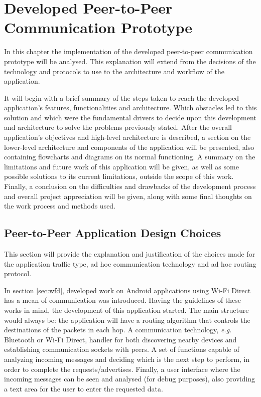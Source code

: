 \chapter{Developed Peer-to-Peer Communication Prototype}
\label{chapter:work}

In this chapter the implementation of the developed peer-to-peer communication prototype will be analysed. This explanation will extend from the decisions of the technology and protocols to use to the architecture and workflow of the application.

It will begin with a brief summary of the steps taken to reach the developed application's features, functionalities and architecture. Which obstacles led to this solution and which were the fundamental drivers to decide upon this development and architecture to solve the problems previously stated. After the overall application's objectives and high-level architecture is described, a section on the lower-level architecture and components of the application will be presented, also containing flowcharts and diagrams on its normal functioning. A summary on the limitations and future work of this application will be given, as well as some possible solutions to its current limitations, outside the scope of this work. Finally, a conclusion on the difficulties and drawbacks of the development process and overall project appreciation will be given, along with some final thoughts on the work process and methods used.

\section{Peer-to-Peer Application Design Choices}

This section will provide the explanation and justification of the choices made for the application traffic type, ad hoc communication technology and ad hoc routing protocol.

In section \ref{sec:wfd}, developed work on Android applications using Wi-Fi Direct has a mean of communication was introduced. Having the guidelines of these works in mind, the development of this application started. The main structure would always be: the application will have a routing algorithm that controls the destinations of the packets in each hop. A communication technology, \textit{e.g.} Bluetooth or Wi-Fi Direct, handler for both discovering nearby devices and establishing communication sockets with peers. A set of functions capable of analyzing incoming messages and deciding which is the next step to perform, in order to complete the requests/advertises. Finally, a user interface where the incoming messages can be seen and analysed (for debug purposes), also providing a text area for the user to enter the requested data.

